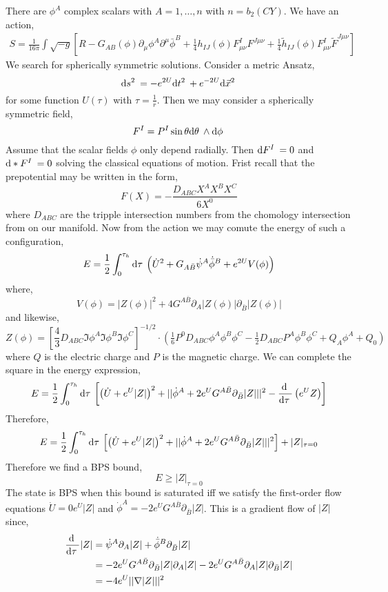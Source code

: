 \documentclass[12pt]{extarticle}
\begin{document}
There are $\phi^A$ complex scalars with $A = 1, \dots, n$ with $n = b_2(CY)$. We have an action,
\begin{align*}
S = \frac{1}{16 \pi} \int \sqrt{-g} \left[ R - G_{AB}(\phi) \partial_\mu \phi^A \partial^\mu \bar{\phi}^B + \tfrac{1}{4} h_{IJ}(\phi) F_{\mu \nu}^I F^{J \mu \nu} + \tfrac{1}{4} \tilde{h}_{IJ}(\phi) F^I_{\mu \nu} \tilde{F}^{J \mu \nu} \right]
\end{align*} 
We search for spherically symmetric solutions. Consider a metric Ansatz,
\[ \mathrm{d}s^2 \: = - e^{2 U} \mathrm{d}t^2 \: + e^{-2 U} \mathrm{d}\vec{x}^2 \: \]
for some function $U(\tau)$ with $\tau = \frac{1}{r}$. Then we may consider a spherically symmetric field,
\[ F^I = P^I \sin{\theta} \mathrm{d}\theta \: \wedge \mathrm{d}\phi \: \]
Assume that the scalar fields $\phi$ only depend radially. Then $\mathrm{d}F^I \: = 0$ and $\mathrm{d}* F^I \: = 0$ solving the classical equations of motion. Frist recall that the prepotential may be written in the form,
\[ F(X) = - \frac{D_{ABC} X^A X^B X^C}{6 X^0} \]
where $D_{ABC}$ are the tripple intersection numbers from the chomology intersection from on our manifold. 
Now from the action we may comute the energy of such a configuration,
\[ E = \frac{1}{2} \int_0^{\tau_h} \mathrm{d}\tau \: \left( \dot{U}^2 + G_{A \bar{B}} \dot{\psi}^A \dot{\bar{\phi}}^B + e^{2 U} V(\phi) \right) \]
where,
\[ V(\phi) = |Z(\phi)|^2 + 4 G^{A \bar{B}} \partial_A |Z(\phi)| \partial_{\bar{B}} |Z(\phi)| \]
and likewise,
\[ Z(\phi) = \left[ \frac{4}{3} D_{ABC} \Im{\phi^A} \Im{\phi^B} \Im{\phi^C} \right]^{-1/2} \cdot \left( \tfrac{1}{6} P^0 D_{ABC} \phi^A \phi^B \phi^C - \tfrac{1}{2} D_{ABC} P^A \phi^B \phi^C + Q_A \phi^A + Q_0 \right)  \]
where $Q$ is the electric charge and $P$ is the magnetic charge. We can complete the square in the energy expression,
\begin{align*}
E = \frac{1}{2} \int_0^{\tau_h} \mathrm{d}\tau \: \left[ \left( \dot{U} + e^U |Z| \right)^2 + || \dot{\phi}^A + 2 e^U G^{A \bar{B}} \partial_{\bar{B}} |Z| ||^2 - \frac{\mathrm{d} \:}{\mathrm{d}\tau \:} \left( 	e^U Z \right) \right]
\end{align*}
Therefore,
\[ E = \frac{1}{2} \int_0^{\tau_h} \mathrm{d}\tau \: \left[ \left( \dot{U} + e^U |Z| \right)^2 + || \dot{\phi}^A + 2 e^U G^{A \bar{B}} \partial_{\bar{B}} |Z| ||^2  \right] + |Z|_{\tau = 0} \]
Therefore we find a BPS bound,
\[ E \ge |Z|_{\tau = 0} \]
The state is BPS when this bound is saturated iff we satisfy the first-order flow equations $\dot{U} = 0 e^U |Z|$ and $\dot{\phi}^A = - 2 e^U G^{A \bar{B}} \partial_{\bar{B}} |Z|$. This is a gradient flow of $|Z|$ since,
\begin{align*}
\frac{\mathrm{d} \:}{\mathrm{d}\tau \:} |Z| & = \dot{\psi}^A \partial_A |Z| + \dot{\bar{\phi}}^B \partial_{\bar{B}} |Z| 
\\
& = - 2 e^U G^{A \bar{B}} \partial_{\bar{B}} |Z| \partial_A |Z| - 2 e^U G^{A \bar{B}} \partial_A |Z| \partial_{\bar{B}} |Z|
\\
& = - 4 e^U || \nabla |Z| ||^2 
\end{align*}
\end{document}
